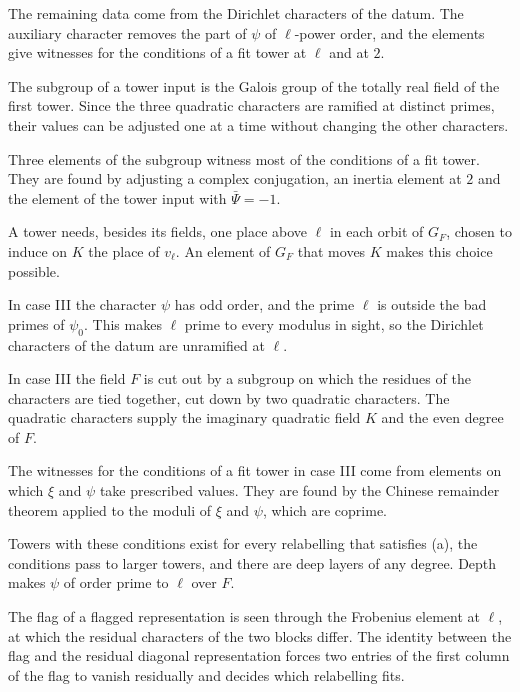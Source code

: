 The remaining data come from the Dirichlet characters of the datum. The auxiliary character removes the part of $\psi$ of $\ell$-power order, and the elements give witnesses for the conditions of a fit tower at $\ell$ and at $2$.

The subgroup of a tower input is the Galois group of the totally real field of the first tower. Since the three quadratic characters are ramified at distinct primes, their values can be adjusted one at a time without changing the other characters.

Three elements of the subgroup witness most of the conditions of a fit tower. They are found by adjusting a complex conjugation, an inertia element at $2$ and the element of the tower input with $\bar\Psi=-1$.

A tower needs, besides its fields, one place above $\ell$ in each orbit of $G_F$, chosen to induce on $K$ the place of $v_\ell$. An element of $G_F$ that moves $K$ makes this choice possible.

In case III the character $\psi$ has odd order, and the prime $\ell$ is outside the bad primes of $\psi_0$. This makes $\ell$ prime to every modulus in sight, so the Dirichlet characters of the datum are unramified at $\ell$.

In case III the field $F$ is cut out by a subgroup on which the residues of the characters are tied together, cut down by two quadratic characters. The quadratic characters supply the imaginary quadratic field $K$ and the even degree of $F$.

The witnesses for the conditions of a fit tower in case III come from elements on which $\xi$ and $\psi$ take prescribed values. They are found by the Chinese remainder theorem applied to the moduli of $\xi$ and $\psi$, which are coprime.

Towers with these conditions exist for every relabelling that satisfies (a), the conditions pass to larger towers, and there are deep layers of any degree. Depth makes $\psi$ of order prime to $\ell$ over $F$.

The flag of a flagged representation is seen through the Frobenius element at $\ell$, at which the residual characters of the two blocks differ. The identity between the flag and the residual diagonal representation forces two entries of the first column of the flag to vanish residually and decides which relabelling fits.

